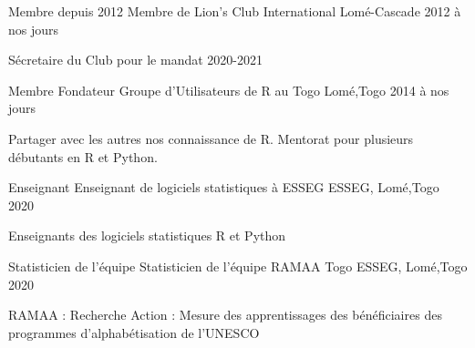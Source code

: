 

\begin{cventries}

  \cventry
    {Membre depuis 2012} %
    {Membre de Lion's Club International} %
    {Lomé-Cascade} %
    {2012 à nos jours} %
    {
      \begin{cvitems} %
        \item {Sécretaire du Club pour le mandat 2020-2021}
      \end{cvitems}
    }

  \cventry
    {Membre Fondateur} %
    {Groupe d'Utilisateurs de R au Togo} %
    {Lomé,Togo} %
    {2014 à nos jours} %
    {
      \begin{cvitems} %
        \item {Partager avec les autres nos connaissance de R. Mentorat pour plusieurs débutants en R et Python.}
      \end{cvitems}
    }

  \cventry
    {Enseignant} %
    {Enseignant de logiciels statistiques à ESSEG} %
    {ESSEG, Lomé,Togo} %
    {2020} %
    {
      \begin{cvitems} %
        \item {Enseignants des logiciels statistiques R et Python}
      \end{cvitems}
    }

  \cventry
    {Statisticien de l'équipe} %
    {Statisticien de l'équipe RAMAA Togo} %
    {ESSEG, Lomé,Togo} %
    {2020} %
    {
      \begin{cvitems} %
        \item {RAMAA : Recherche Action : Mesure des apprentissages des bénéficiaires des programmes d’alphabétisation de l'UNESCO}
      \end{cvitems}
    }

\end{cventries}
